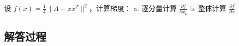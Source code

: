 \begin{example}[矩阵逼近梯度]
    设 \(f(x) = \frac{1}{4}\|A - xx^T\|^2\)，计算梯度：  
    a. 逐分量计算 \(\frac{\partial f}{\partial x_k}\)  
    b. 整体计算 \(\frac{\partial f}{\partial x}\)
    \end{example}
    
    \subsection*{解答过程}
    